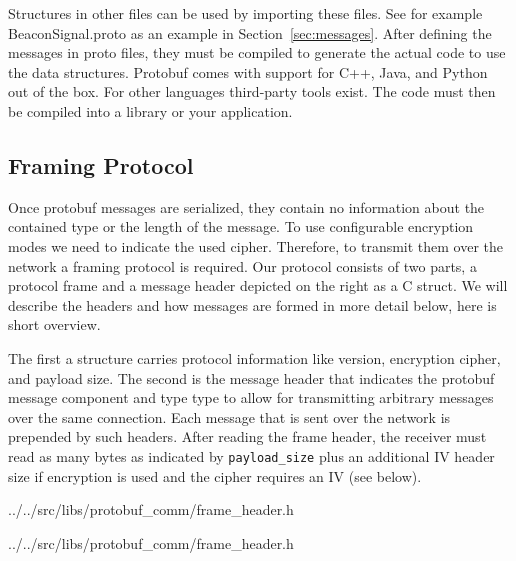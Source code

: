 \documentclass[a4paper]{article}
\newcommand{\refsec}[1]{Section~\ref{#1}}
\begin{document}
Structures in other files can be used by importing these files. See
for example BeaconSignal.proto as an example in
\refsec{sec:messages}.  After defining the messages in proto files,
they must be compiled to generate the actual code to use the data
structures. Protobuf comes with support for C++, Java, and Python
out of the box. For other languages third-party tools exist. The
code must then be compiled into a library or your application.

\subsection{Framing Protocol}

\begin{minipage}{\linewidth}
  \begin{minipage}[t]{.64\linewidth}
    \vspace{0pt}

    Once protobuf messages are serialized, they contain no information
    about the contained type or the length of the message. To use
    configurable encryption modes we need to indicate the used
    cipher. Therefore, to transmit them over the network a framing
    protocol is required. Our protocol consists of two parts, a
    protocol frame and a message header depicted on the right as a C
    struct. We will describe the headers and how messages are formed
    in more detail below, here is short overview.

    The first a structure carries protocol information like version,
    encryption cipher, and payload size. The second is the message
    header that indicates the protobuf message component and type type
    to allow for transmitting arbitrary messages over the same
    connection. Each message that is sent over the network is
    prepended by such headers.  After reading the frame header, the
    receiver must read as many bytes as indicated by
    \texttt{payload\_size} plus an additional IV header size if
    encryption is used and the cipher requires an IV (see below).
  \end{minipage}
  \hspace{.01\linewidth}
  \begin{minipage}[t]{.34\linewidth}
    \vspace{0pt}

{../../src/libs/protobuf_comm/frame_header.h}


{../../src/libs/protobuf_comm/frame_header.h}
  \end{minipage}
\end{minipage}
\end{document}
